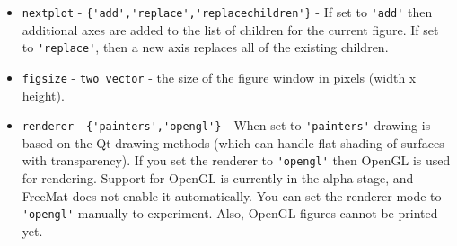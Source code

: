 \begin{itemize}
\item  \verb|nextplot| - \verb|{'add','replace','replacechildren'}| - If set to \verb|'add'| then
 additional axes are added to the list of children for the current figure.  If set to 
 \verb|'replace'|, then a new axis replaces all of the existing children.

\item  \verb|figsize| - \verb|two vector| - the size of the figure window in pixels (width x height).

\item  \verb|renderer| - \verb|{'painters','opengl'}| - When set to \verb|'painters'| drawing is based
 on the Qt drawing methods (which can handle flat shading of surfaces with transparency).
 If you set the renderer to \verb|'opengl'| then OpenGL is used for rendering.  Support for 
 OpenGL is currently in the alpha stage, and FreeMat does not enable it automatically.
 You can set the renderer mode to \verb|'opengl'| manually to experiment.  Also, OpenGL 
 figures cannot be printed yet.

\end{itemize}
